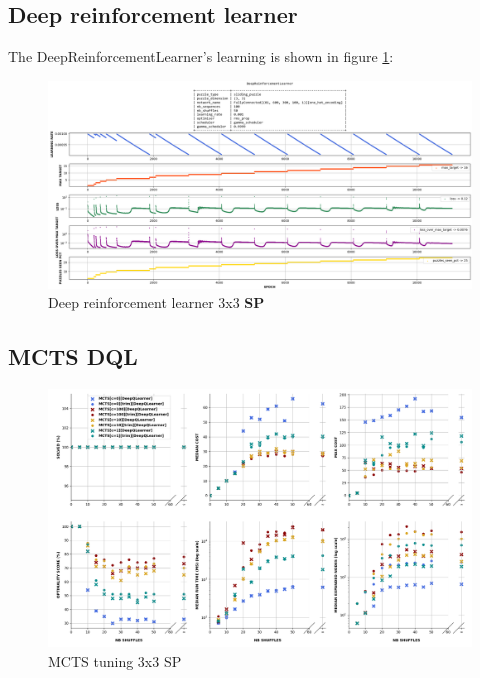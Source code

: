 \subsection{Deep reinforcement learner}
 The DeepReinforcementLearner's learning is shown in figure \ref{fig:33SPDeepReinforcementLearning}:

\begin{landscape}
\centering\vspace*{\fill}
\begin{figure}[H]
\centering
\includegraphics[align=c, scale=0.55]{./Figures/33SPDeepReinforcementLearning}
\caption[33SPDeepReinforcementLearning]{Deep reinforcement learner 3x3 \textbf{SP}}
\label{fig:33SPDeepReinforcementLearning}
\end{figure}
\vfill
\end{landscape}
\restoregeometry


\subsection{MCTS DQL}

\begin{landscape}
\centering\vspace*{\fill}
\begin{figure}[H]
\centering
\includegraphics[align=c, scale=0.55]{./Figures/33SPPerformanceMCTS}
\caption[33SPPerformanceMCTS]{MCTS tuning 3x3 SP}
\label{fig:33SPPerformanceMCTS}
\end{figure}
\vfill
\end{landscape}
\restoregeometry



